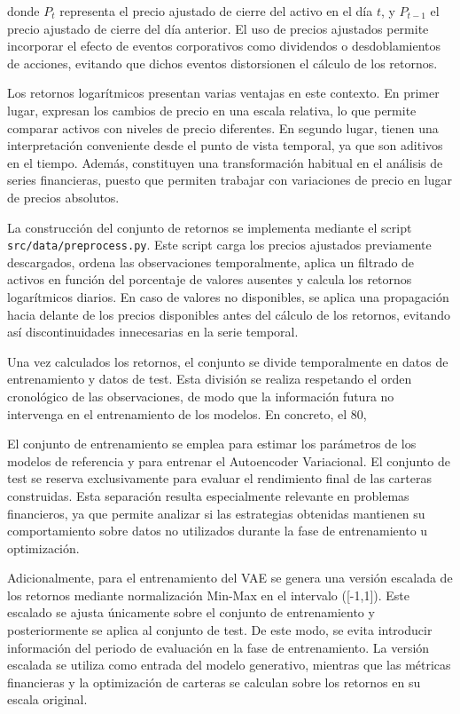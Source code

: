 donde \(P_t\) representa el precio ajustado de cierre del activo en el día \(t\), y \(P_{t-1}\) el precio ajustado de cierre del día anterior. El uso de precios ajustados permite incorporar el efecto de eventos corporativos como dividendos o desdoblamientos de acciones, evitando que dichos eventos distorsionen el cálculo de los retornos.

Los retornos logarítmicos presentan varias ventajas en este contexto. En primer lugar, expresan los cambios de precio en una escala relativa, lo que permite comparar activos con niveles de precio diferentes. En segundo lugar, tienen una interpretación conveniente desde el punto de vista temporal, ya que son aditivos en el tiempo. Además, constituyen una transformación habitual en el análisis de series financieras, puesto que permiten trabajar con variaciones de precio en lugar de precios absolutos.

La construcción del conjunto de retornos se implementa mediante el script \texttt{src/data/preprocess.py}. Este script carga los precios ajustados previamente descargados, ordena las observaciones temporalmente, aplica un filtrado de activos en función del porcentaje de valores ausentes y calcula los retornos logarítmicos diarios. En caso de valores no disponibles, se aplica una propagación hacia delante de los precios disponibles antes del cálculo de los retornos, evitando así discontinuidades innecesarias en la serie temporal.

Una vez calculados los retornos, el conjunto se divide temporalmente en datos de entrenamiento y datos de test. Esta división se realiza respetando el orden cronológico de las observaciones, de modo que la información futura no intervenga en el entrenamiento de los modelos. En concreto, el 80,%

El conjunto de entrenamiento se emplea para estimar los parámetros de los modelos de referencia y para entrenar el Autoencoder Variacional. El conjunto de test se reserva exclusivamente para evaluar el rendimiento final de las carteras construidas. Esta separación resulta especialmente relevante en problemas financieros, ya que permite analizar si las estrategias obtenidas mantienen su comportamiento sobre datos no utilizados durante la fase de entrenamiento u optimización.

Adicionalmente, para el entrenamiento del VAE se genera una versión escalada de los retornos mediante normalización Min-Max en el intervalo ([-1,1]). Este escalado se ajusta únicamente sobre el conjunto de entrenamiento y posteriormente se aplica al conjunto de test. De este modo, se evita introducir información del periodo de evaluación en la fase de entrenamiento. La versión escalada se utiliza como entrada del modelo generativo, mientras que las métricas financieras y la optimización de carteras se calculan sobre los retornos en su escala original.

